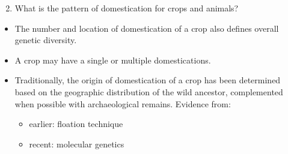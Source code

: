 \documentclass[
  ignorenonframetext,
  aspectratio=169]{beamer}
\providecommand{\tightlist}{%
  \setlength{\itemsep}{0pt}\setlength{\parskip}{0pt}}
\begin{document}
\begin{frame}{}
\protect\hypertarget{section-3}{}
\footnotesize

\begin{enumerate}[<+->]
\setcounter{enumi}{1}
\tightlist
\item
  \alert{What is the pattern of domestication for crops and animals?}
\end{enumerate}

\begin{itemize}[<+->]
\tightlist
\item
  The number and location of domestication of a crop also defines
  overall genetic diversity.
\item
  A crop may have a single or multiple domestications.
\item
  Traditionally, the origin of domestication of a crop has been
  determined based on the geographic distribution of the wild ancestor,
  complemented when possible with archaeological remains. Evidence from:

  \begin{itemize}[<+->]
  \tightlist
  \item
    earlier: floation technique
  \item
    recent: molecular genetics
  \end{itemize}
\end{itemize}
\end{frame}
\end{document}
